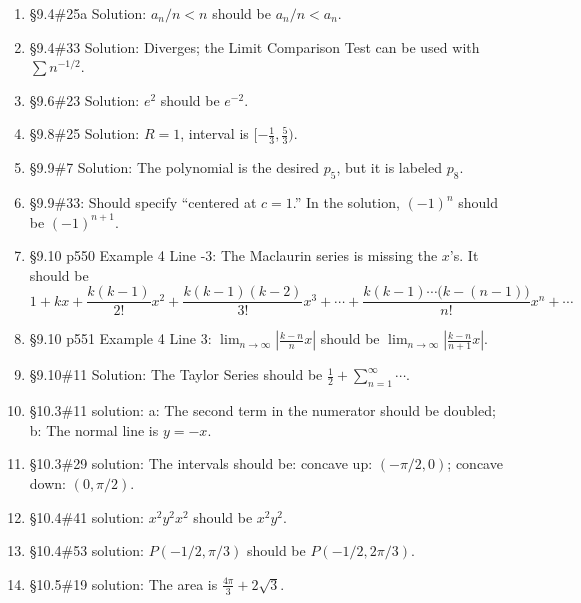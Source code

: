 \documentclass{amsart}
\newcommand{\ds}{\displaystyle}
\newcommand{\abs}[1]{\left\lvert#1\right\rvert}
\begin{document}
\begin{enumerate}
\item \S9.4\#25a Solution: $a_n/n<n$ should be $a_n/n<a_n$.
\item \S9.4\#33 Solution: Diverges; the Limit Comparison Test can be used with $\sum n^{-1/2}$.
\item \S9.6\#23 Solution: $e^2$ should be $e^{-2}$.
\item \S9.8\#25 Solution: $R=1$, interval is $[-\frac13,\frac53)$.
\item \S9.9\#7 Solution: The polynomial is the desired $p_5$, but it is labeled $p_8$.
\item \S9.9\#33: Should specify ``centered at $c=1$.''  In the solution, $(-1)^n$ should be $(-1)^{n+1}$.
\item \S9.10 p550 Example 4 Line -3: The Maclaurin series is missing the $x$'s.  It should be
\[
1+ kx + \frac{k(k-1)}{2!}x^2 + \frac{k(k-1)(k-2)}{3!}x^3 + \dotsb + \frac{k(k-1)\dotsm\big(k-(n-1)\big)}{n!}x^n+\dotsb
\]
\item \S9.10 p551 Example 4 Line 3: $\ds\lim_{n\to\infty} \abs{\frac{k-n}{n}x}$ should be $\ds\lim_{n\to\infty} \abs{\frac{k-n}{n+1}x}$.
\item \S9.10\#11 Solution: The Taylor Series should be $\frac12+\sum_{n=1}^\infty\dotsb$.
\item \S10.3\#11 solution: a: The second term in the numerator should be doubled; b: The normal line is $y=-x$.
\item \S10.3\#29 solution: The intervals should be: concave up: $(-\pi/2,0)$; concave down: $(0,\pi/2)$.
\item \S10.4\#41 solution: $x^2y^2x^2$ should be $x^2y^2$.
\item \S10.4\#53 solution: $P(-1/2,\pi/3)$ should be $P(-1/2,2\pi/3)$.
\item \S10.5\#19 solution: The area is $\frac{4\pi}{3}+2\sqrt 3$.
\label{2017-07-27IIplus}
\end{enumerate}


\end{document}
